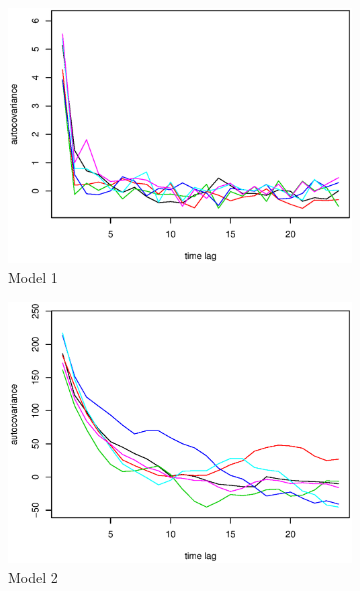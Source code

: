 \documentclass{article}
\begin{document}
 \begin{figure}[!htb]
     \centering
 	\begin{subfigure}[b]{0.45\textwidth}
 	\includegraphics[width = \textwidth]{Model1acv.eps}
 	\caption{Model 1}
 	\end{subfigure}%
 	\begin{subfigure}[b]{0.45\textwidth}
 	\includegraphics[width = \textwidth]{Model2acv.eps}
 	\caption{Model 2}
 	\end{subfigure}%
 	\\
 	\begin{subfigure}[b]{0.45\textwidth}

\end{subfigure}
\end{figure}
\end{document}
